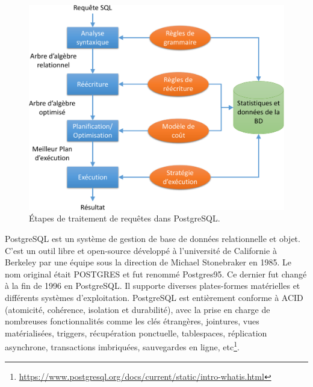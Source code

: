\begin{figure}
	\centering
	\includegraphics[scale=0.55]{chapitre5/chap5Fig/postgres-query-optimizer.pdf}
	\caption{Étapes de traitement de requêtes dans PostgreSQL.}
	\label{fig:postgres-query-optimizer}
\end{figure}

PostgreSQL est un système de gestion de base de données relationnelle et objet. C'est un outil libre et open-source développé à l'université de Californie à Berkeley par une équipe sous la direction de Michael Stonebraker en 1985. Le nom original était POSTGRES et fut renommé Postgres95. Ce dernier fut changé à la fin de 1996 en PostgreSQL. Il supporte diverses plates-formes matérielles et différents systèmes d'exploitation. PostgreSQL est entièrement conforme à ACID (atomicité, cohérence, isolation et durabilité), avec la prise en charge de nombreuses fonctionnalités comme les clés étrangères, jointures, vues matérialisées, triggers, récupération ponctuelle, tablespaces, réplication asynchrone, transactions imbriquées, sauvegardes en ligne, etc\footnote{\url{https://www.postgresql.org/docs/current/static/intro-whatis.html}}.

